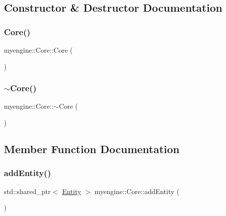 \subsection{Constructor \& Destructor Documentation}
\mbox{\label{classmyengine_1_1_core_a51a936e2f539b33caaf91b9b38d5e8da}} 
\subsubsection{\texorpdfstring{Core()}{Core()}}
{\footnotesize\ttfamily myengine\+::\+Core\+::\+Core (\begin{DoxyParamCaption}{ }\end{DoxyParamCaption})}

\mbox{\label{classmyengine_1_1_core_af8293765bd17b1e0003df3820fa38990}} 
\subsubsection{\texorpdfstring{$\sim$\+Core()}{~Core()}}
{\footnotesize\ttfamily myengine\+::\+Core\+::$\sim$\+Core (\begin{DoxyParamCaption}{ }\end{DoxyParamCaption})}



\subsection{Member Function Documentation}
\mbox{\label{classmyengine_1_1_core_abf2eea4d6b0d3788761ea11f34c4981d}} 
\subsubsection{\texorpdfstring{add\+Entity()}{addEntity()}}
{\footnotesize\ttfamily std\+::shared\+\_\+ptr$<$ \hyperlink{classmyengine_1_1_entity}{Entity} $>$ myengine\+::\+Core\+::add\+Entity (\begin{DoxyParamCaption}{ }\end{DoxyParamCaption})}

